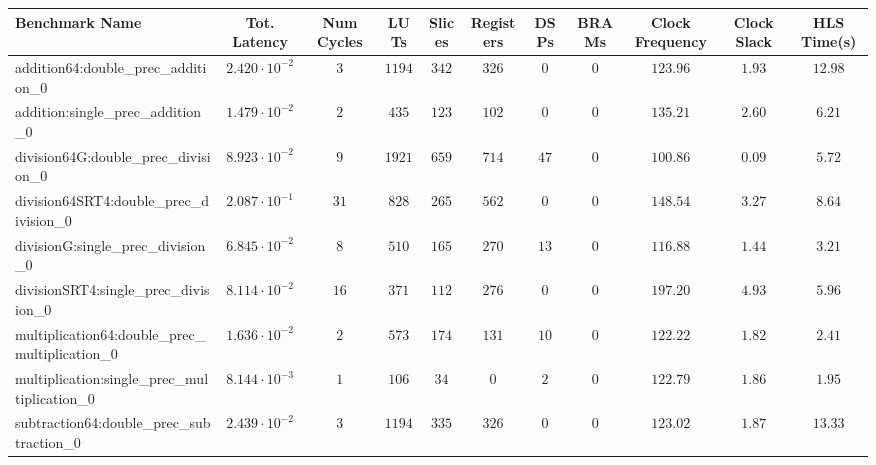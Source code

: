 \begin{tabular}{|l|c|c|c|c|c|c|c|c|c|c|}
\hline
Benchmark Name                                   & Tot. Latency            & Num Cycles & LUTs     & Slices   & Registers & DSPs   & BRAMs & Clock Frequency & Clock Slack & HLS Time(s) \\
\hline
addition64:double\_prec\_addition\_0             & $ 2.420 \cdot 10^{-2} $ & $ 3      $ & $ 1194 $ & $ 342  $ & $ 326   $ & $ 0  $ & $ 0 $ & $ 123.96      $ & $ 1.93    $ & $ 12.98   $ \\
addition:single\_prec\_addition\_0               & $ 1.479 \cdot 10^{-2} $ & $ 2      $ & $ 435  $ & $ 123  $ & $ 102   $ & $ 0  $ & $ 0 $ & $ 135.21      $ & $ 2.60    $ & $ 6.21    $ \\
division64G:double\_prec\_division\_0            & $ 8.923 \cdot 10^{-2} $ & $ 9      $ & $ 1921 $ & $ 659  $ & $ 714   $ & $ 47 $ & $ 0 $ & $ 100.86      $ & $ 0.09    $ & $ 5.72    $ \\
division64SRT4:double\_prec\_division\_0         & $ 2.087 \cdot 10^{-1} $ & $ 31     $ & $ 828  $ & $ 265  $ & $ 562   $ & $ 0  $ & $ 0 $ & $ 148.54      $ & $ 3.27    $ & $ 8.64    $ \\
divisionG:single\_prec\_division\_0              & $ 6.845 \cdot 10^{-2} $ & $ 8      $ & $ 510  $ & $ 165  $ & $ 270   $ & $ 13 $ & $ 0 $ & $ 116.88      $ & $ 1.44    $ & $ 3.21    $ \\
divisionSRT4:single\_prec\_division\_0           & $ 8.114 \cdot 10^{-2} $ & $ 16     $ & $ 371  $ & $ 112  $ & $ 276   $ & $ 0  $ & $ 0 $ & $ 197.20      $ & $ 4.93    $ & $ 5.96    $ \\
multiplication64:double\_prec\_multiplication\_0 & $ 1.636 \cdot 10^{-2} $ & $ 2      $ & $ 573  $ & $ 174  $ & $ 131   $ & $ 10 $ & $ 0 $ & $ 122.22      $ & $ 1.82    $ & $ 2.41    $ \\
multiplication:single\_prec\_multiplication\_0   & $ 8.144 \cdot 10^{-3} $ & $ 1      $ & $ 106  $ & $ 34   $ & $ 0     $ & $ 2  $ & $ 0 $ & $ 122.79      $ & $ 1.86    $ & $ 1.95    $ \\
subtraction64:double\_prec\_subtraction\_0       & $ 2.439 \cdot 10^{-2} $ & $ 3      $ & $ 1194 $ & $ 335  $ & $ 326   $ & $ 0  $ & $ 0 $ & $ 123.02      $ & $ 1.87    $ & $ 13.33   $ \\

\end{tabular}
